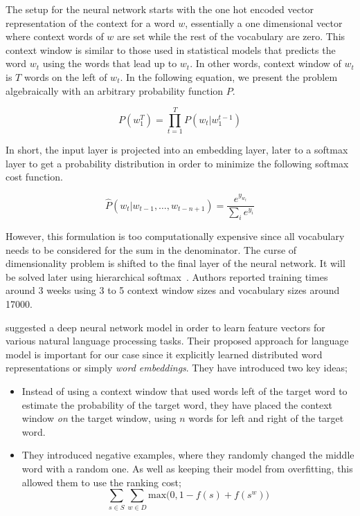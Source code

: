 The setup for the neural network starts with the one hot encoded vector representation of the context for a word $w$, essentially a one dimensional vector where context words of $w$ are set while the rest of the vocabulary are zero.
This context window is similar to those used in statistical models that predicts the word $w_t$ using the words that lead up to $w_t$.
In other words, context window of $w_t$ is $T$ words on the left of $w_t$.
In the following equation, we present the problem algebraically with an arbitrary probability function $P$.

\begin{displaymath}
    P(w_1^T) = \prod_{t=1}^{T}P(w_t | w_{1}^{t-1})
\end{displaymath}

In short, the input layer is projected into an embedding layer, later to a softmax layer to get a probability distribution in order to minimize the following softmax cost function.

\begin{equation}%
    \label{eqn:bengio_softmax}
    \hat{P}(w_t|w_{t-1}, \dots, w_{t-n+1}) = \frac{e^{y_{w_{t}}}}{\sum_{i}e^{y_{i}}}
\end{equation}

However, this formulation is too computationally expensive since all vocabulary needs to be considered for the sum in the denominator.
The curse of dimensionality problem is shifted to the final layer of the neural network.
It will be solved later using hierarchical softmax~\cite{mikolov_distributed_2013}.
Authors reported training times around 3 weeks using 3 to 5 context window sizes and vocabulary sizes around 17000.

\textcite{collobert_unified_2008} suggested a deep neural network model in order to learn feature vectors for various natural language processing tasks.
Their proposed approach for language model is important for our case since it explicitly learned distributed word representations or simply \emph{word embeddings}.
They have introduced two key ideas;
\begin{itemize}
    \item Instead of using a context window that used words left of the target word to estimate the probability of the target word, they have placed the context window \emph{on} the target window, using $n$ words for left and right of the target word.
    \item They introduced negative examples, where they randomly changed the middle word with a random one. As well as keeping their model from overfitting, this allowed them to use the ranking cost;
        \begin{displaymath}
            \sum_{s \in S} \sum_{w \in D} \text{max}\big( 0, 1 - f(s) + f(s^w)\big)
        \end{displaymath}
\end{itemize}

